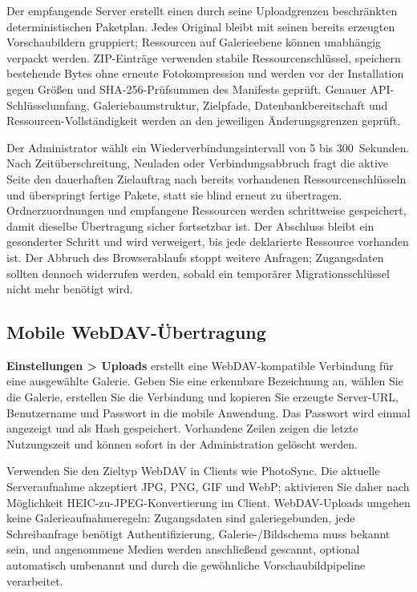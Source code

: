 \documentclass[11pt,a4paper]{article}
\newcommand{\ui}[1]{\textbf{#1}}
\begin{document}
Der empfangende Server erstellt einen durch seine Uploadgrenzen beschränkten
deterministischen Paketplan. Jedes Original bleibt mit seinen bereits erzeugten
Vorschaubildern gruppiert; Ressourcen auf Galerieebene können unabhängig
verpackt werden. ZIP-Einträge verwenden stabile Ressourcenschlüssel, speichern
bestehende Bytes ohne erneute Fotokompression und werden vor der Installation
gegen Größen und SHA-256-Prüfsummen des Manifests geprüft. Genauer
API-Schlüsselumfang, Galeriebaumstruktur, Zielpfade, Datenbankbereitschaft und
Ressourcen-Vollständigkeit werden an den jeweiligen Änderungsgrenzen geprüft.

Der Administrator wählt ein Wiederverbindungsintervall von 5 bis 300~Sekunden.
Nach Zeitüberschreitung, Neuladen oder Verbindungsabbruch fragt die aktive Seite
den dauerhaften Zielauftrag nach bereits vorhandenen Ressourcenschlüsseln und
überspringt fertige Pakete, statt sie blind erneut zu übertragen.
Ordnerzuordnungen und empfangene Ressourcen werden schrittweise gespeichert,
damit dieselbe Übertragung sicher fortsetzbar ist. Der Abschluss bleibt ein
gesonderter Schritt und wird verweigert, bis jede deklarierte Ressource
vorhanden ist. Der Abbruch des Browserablaufs stoppt weitere Anfragen;
Zugangsdaten sollten dennoch widerrufen werden, sobald ein temporärer
Migrationsschlüssel nicht mehr benötigt wird.

\subsection{Mobile WebDAV-Übertragung}

\ui{Einstellungen > Uploads} erstellt eine WebDAV-kompatible Verbindung für eine
ausgewählte Galerie. Geben Sie eine erkennbare Bezeichnung an, wählen Sie die
Galerie, erstellen Sie die Verbindung und kopieren Sie erzeugte Server-URL,
Benutzername und Passwort in die mobile Anwendung. Das Passwort wird einmal
angezeigt und als Hash gespeichert. Vorhandene Zeilen zeigen die letzte
Nutzungszeit und können sofort in der Administration gelöscht werden.

Verwenden Sie den Zieltyp WebDAV in Clients wie PhotoSync. Die aktuelle
Serveraufnahme akzeptiert JPG, PNG, GIF und WebP; aktivieren Sie daher nach
Möglichkeit HEIC-zu-JPEG-Konvertierung im Client. WebDAV-Uploads umgehen keine
Galerieaufnahmeregeln: Zugangsdaten sind galeriegebunden, jede Schreibanfrage
benötigt Authentifizierung, Galerie-/Bildschema muss bekannt sein, und
angenommene Medien werden anschließend gescannt, optional automatisch umbenannt
und durch die gewöhnliche Vorschaubildpipeline verarbeitet.
\end{document}
